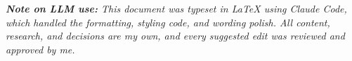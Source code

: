 \documentclass[11pt,letterpaper]{article}
\begin{document}
\vspace{2pt}
{\small\itshape\color{midgray}\textbf{Note on LLM use:} This document was typeset in LaTeX using Claude Code, which handled the formatting, styling code, and wording polish. All content, research, and decisions are my own, and every suggested edit was reviewed and approved by me.}
\end{document}
